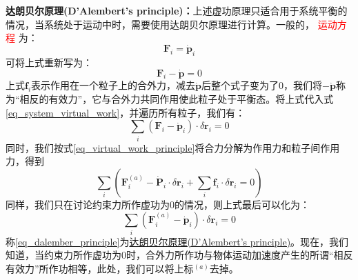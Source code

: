 \textbf{达朗贝尔原理(D'Alembert's principle)：}上述虚功原理只适合用于系统平衡的情况，当系统处于运动中时，需要使用达朗贝尔原理进行计算。一般的，\textcolor{red}{ 运动方程 }为：
\begin{equation*}
	\bm{F}_i = \dot{\bm{p}}_i
\end{equation*} 
可将上式重新写为：
\begin{equation*}
	\bm{F}_i - \dot{\bm{p}} = 0
\end{equation*}
上式$\bm{f}_i$表示作用在一个粒子上的合外力，减去$\dot{\bm{p}}$后整个式子变为了0，我们将$-\dot{\bm{p}}$称为“相反的有效力”，它与合外力共同作用使此粒子处于平衡态。将上式代入式\eqref{eq_system_virtual_work}，并遍历所有粒子，我们有：
\begin{equation}
	\sum_{i}(\bm{F}_i - \dot{\bm{p}}_i) \cdot \delta \bm{r}_i = 0
\end{equation} 
同时，我们按式\eqref{eq_virtual_work_principle}将合力分解为作用力和粒子间作用力，得到
\begin{equation*}
	\sum_i (\bm{F}^{(a)}_i - \dot{\bm{P}}_i \cdot \delta \bm{r}_i + \sum_i \bm{f}_i \cdot \delta \bm{r}_i = 0)
\end{equation*} 
同样，我们只在讨论约束力所作虚功为0的情况，则上式最后可以化为：
\begin{equation}
	\sum_i (\bm{F}^{(a)}_{i} - \dot{\bm{p}}_i) \cdot \delta \bm{r}_i = 0	\label{eq_dalember_principle}
\end{equation} 
称\eqref{eq_dalember_principle}为\underline{达朗贝尔原理(D'Alembert's principle)}。现在，我们知道，当约束力所作虚功为0时，合外力所作功与物体运动加速度产生的所谓“相反有效力”所作功相等，此处，我们可以将上标$^{(a)}$去掉。

